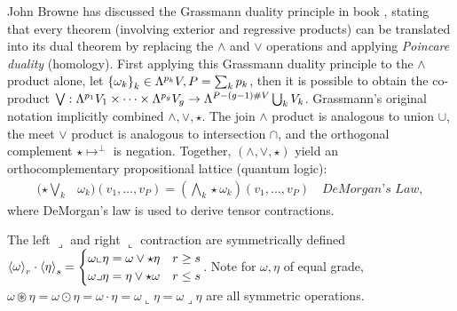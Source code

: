 \documentclass{juliacon}
\begin{document}
John Browne has discussed the Grassmann duality principle in book \cite{browne}, stating that every theorem (involving exterior and regressive products) can be translated into its dual theorem by replacing the $\wedge$ and $\vee$ operations and applying \textit{Poincare duality} (homology).
First applying this Grassmann duality principle to the $\wedge$ product alone, let $\left\{ \omega_k \right\}_k\in\Lambda^{p_k}V, P=\sum_kp_k$, then it is possible to obtain the co-product
$\bigvee :\Lambda^{p_1}V_1\times\dots\times\Lambda^{p_g}V_g \rightarrow \Lambda^{P-(g-1)\#V}\bigcup_k V_k$.
Grassmann's original notation implicitly combined $\wedge,\vee,\star$.
The join $\wedge$ product is analogous to union $\cup$, the meet $\vee$ product is analogous to intersection $\cap$, and the orthogonal complement $\star\mapsto^\perp$ is negation.
Together, $(\wedge,\vee,\star)$ yield an orthocomplementary propositional lattice (quantum logic):
\begin{align*}
	(\star\bigvee_k &\omega_k)(v_1,\dots,v_P) = (\bigwedge_k\star\omega_k)(v_1,\dots,v_P) \quad \textit{DeMorgan's Law},
\end{align*}
where DeMorgan's law is used to derive tensor contractions.
\begin{definition}
	The left $\lrcorner$ and right $\llcorner$ contraction are symmetrically defined
	$ \left\langle \omega \right\rangle_r\cdot\left\langle \eta \right\rangle_s = \begin{cases} \omega\llcorner\eta=\omega\vee\star\eta & r\geq s \\ \omega\lrcorner\eta=\eta\vee\star\omega & r\leq s \end{cases} $.
	Note for $\omega,\eta$ of equal grade, $\omega\circledast\eta = \omega\odot\eta = \omega\cdot\eta = \omega\llcorner\eta = \omega\lrcorner\eta$ are all symmetric operations.
\end{definition}
\end{document}
